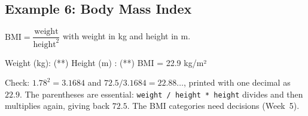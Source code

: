 \subsection{Example 6: Body Mass Index}
$\mathrm{BMI} = \dfrac{\text{weight}}{\text{height}^2}$ with weight in kg and height in m.
\begin{center}
\begin{minipage}[c]{0.34\linewidth}\centering
{}
\end{minipage}\hfill
\begin{minipage}[c]{0.62\linewidth}

\end{minipage}
\end{center}
\begin{consolebox}
\begin{run}
Weight (kg): (**)
Height (m) : (**)
BMI = 22.9 kg/m²
\end{run}
\end{consolebox}
Check: $1.78^2 = 3.1684$ and $72.5 / 3.1684 = 22.88\ldots$, printed with one decimal as $22.9$. The parentheses are essential: \texttt{weight / height * height} divides and then multiplies again, giving back $72.5$. The BMI categories need decisions (Week~5).

